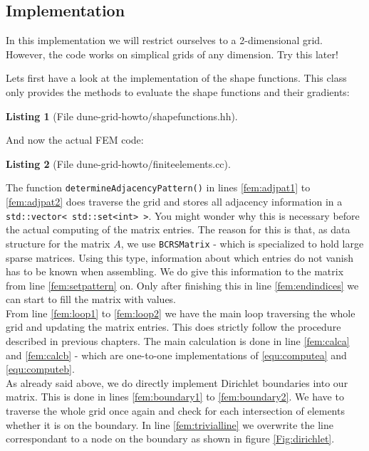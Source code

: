 \documentclass[11pt,a4paper,headinclude,footinclude,DIV16,normalheadings]{scrreprt}
\newtheorem{lst}{Listing}
\begin{document}
\subsection{Implementation}

In this implementation we will restrict ourselves to a 2-dimensional grid. However, the code works on simplical grids of any dimension. Try this later!

Lets first have a look at the implementation of the shape functions. This class only provides the methods to evaluate the shape functions and their gradients:

\begin{lst}[File dune-grid-howto/shapefunctions.hh] \mbox{}
\nopagebreak

\end{lst}

And now the actual FEM code:

\begin{lst}[File dune-grid-howto/finiteelements.cc] \mbox{}
\nopagebreak

\end{lst}

The function \lstinline!determineAdjacencyPattern()! in lines \ref{fem:adjpat1} to \ref{fem:adjpat2} does traverse the grid and stores all adjacency information in a \lstinline!std::vector< std::set<int> >!. You might wonder why this is necessary before the actual computing of the matrix entries. The reason for this is that, as data structure for the matrix $A$, we use \lstinline!BCRSMatrix! - which is specialized to hold large sparse matrices. Using this type, information about which entries do not vanish has to be known when assembling. We do give this information to the matrix from line \ref{fem:setpattern} on. Only after finishing this in line \ref{fem:endindices} we can start to fill the matrix with values. \\

From line \ref{fem:loop1} to \ref{fem:loop2} we have the main loop traversing the whole grid and updating the matrix entries. This does strictly follow the procedure described in previous chapters. The main calculation is done in line \ref{fem:calca} and \ref{fem:calcb} - which are one-to-one implementations of \ref{equ:computea} and \ref{equ:computeb}. \\

As already said above, we do directly implement Dirichlet boundaries into our matrix. This is done in lines \ref{fem:boundary1} to \ref{fem:boundary2}. We have to traverse the whole grid once again and check for each intersection of elements whether it is on the boundary. In line \ref{fem:trivialline} we overwrite the line correspondant to a node on the boundary as shown in figure \ref{Fig:dirichlet}. \\
\end{document}
